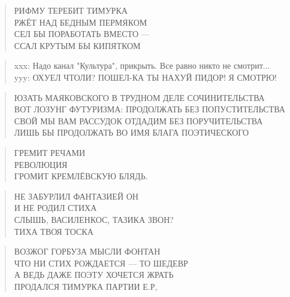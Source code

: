 \poemtitle{***}
\begin{verse}
РИФМУ ТЕРЕБИТ ТИМУРКА\\
РЖЁТ НАД БЕДНЫМ ПЕРМЯКОМ\\
СЕЛ БЫ ПОРАБОТАТЬ  ВМЕСТО —\\
ССАЛ КРУТЫМ БЫ КИПЯТКОМ
\end{verse}

\poemtitle{***}
\begin{verse}
xxx: Надо канал "Культура", прикрыть. Все равно никто не смотрит...\\
yyy: ОХУЕЛ ЧТОЛИ? ПОШЕЛ-КА ТЫ НАХУЙ ПИДОР! Я СМОТРЮ!
\end{verse}

\poemtitle{***}
\begin{verse}
ЮЗАТЬ МАЯКОВСКОГО В ТРУДНОМ ДЕЛЕ СОЧИНИТЕЛЬСТВА\\
ВОТ ЛОЗУНГ ФУТУРИЗМА: ПРОДОЛЖАТЬ БЕЗ ПОПУСТИТЕЛЬСТВА\\
СВОЙ МЫ ВАМ РАССУДОК ОТДАДИМ БЕЗ ПОРУЧИТЕЛЬСТВА\\
ЛИШЬ БЫ ПРОДОЛЖАТЬ ВО ИМЯ БЛАГА ПОЭТИЧЕСКОГО
\end{verse}

\poemtitle{***}
\begin{verse}
ГРЕМИТ РЕЧАМИ\\
РЕВОЛЮЦИЯ\\
ГРОМИТ КРЕМЛЁВСКУЮ БЛЯДЬ.
\end{verse}

\poemtitle{***}
\begin{verse}
НЕ ЗАБУРЛИЛ ФАНТАЗИЕЙ ОН\\
И НЕ РОДИЛ СТИХА\\
СЛЫШЬ, ВАСИЛЕНКОС, ТАЗИКА ЗВОН?\\
ТИХА ТВОЯ ТОСКА
\end{verse}

\poemtitle{***}
\begin{verse}
ВОЗЖОГ ГОРБУЗА МЫСЛИ ФОНТАН\\
ЧТО НИ СТИХ РОЖДАЕТСЯ — ТО ШЕДЕВР\\
А ВЕДЬ ДАЖЕ ПОЭТУ ХОЧЕТСЯ ЖРАТЬ\\
ПРОДАЛСЯ ТИМУРКА ПАРТИИ Е.Р,
\end{verse}

